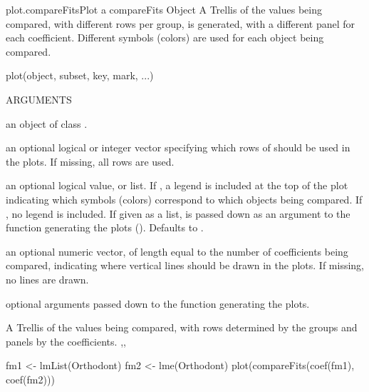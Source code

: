 \documentclass[pdftex]{article} \usepackage{url,graphicx}
\begin{document}
\begin{Helpfile}{plot.compareFits}{Plot a compareFits Object}
A Trellis  of the values being compared, with different
rows per group, is generated, with a different panel for each
coefficient. Different symbols (colors) are used for each object being
compared.
\begin{Example}
plot(object, subset, key, mark, ...)
\end{Example}
\begin{Argument}{ARGUMENTS}
\item[\Co{object:}]
an object of class .
\item[\Co{subset:}]
an optional logical or integer vector specifying which
rows of  should be used in the plots. If missing, all
rows are used.
\item[\Co{key:}]
an optional logical value, or list. If , a legend
is included at the top of the plot indicating which symbols (colors)
correspond to which objects being compared. If , no legend
is included. If given as a list,  is passed down as an
argument to the  function generating the plots
(). Defaults to .
\item[\Co{mark:}]
an optional numeric vector, of length equal to the number of
coefficients being compared, indicating where vertical lines should
be drawn in the plots. If missing, no lines are drawn.
\item[\Co{...:}]
optional arguments passed down to the 
function generating the plots.
\end{Argument}
A Trellis  of the values being compared, with rows
determined by the groups and panels by the coefficients.
,,
\need 15pt
\vspace{-16pt} 
\begin{Example}
fm1 <- lmList(Orthodont)
fm2 <- lme(Orthodont)
plot(compareFits(coef(fm1), coef(fm2)))
\end{Example}
\end{Helpfile}
\end{document}
